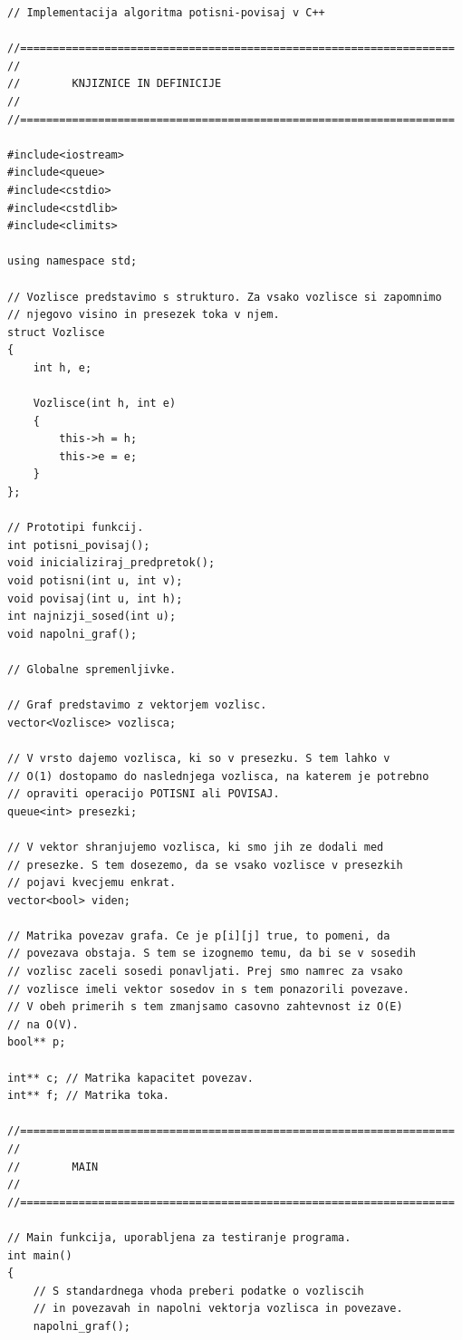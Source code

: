 \documentclass[mat1]{fmfdelo}
\begin{document}
\begin{verbatim}
// Implementacija algoritma potisni-povisaj v C++

//===================================================================
//
//        KNJIZNICE IN DEFINICIJE
//
//===================================================================

#include<iostream>
#include<queue>
#include<cstdio>
#include<cstdlib>
#include<climits>

using namespace std;

// Vozlisce predstavimo s strukturo. Za vsako vozlisce si zapomnimo
// njegovo visino in presezek toka v njem.
struct Vozlisce
{
    int h, e;

    Vozlisce(int h, int e)
    {
        this->h = h;
        this->e = e;
    }
};

// Prototipi funkcij.
int potisni_povisaj();
void inicializiraj_predpretok();
void potisni(int u, int v);
void povisaj(int u, int h);
int najnizji_sosed(int u);
void napolni_graf();

// Globalne spremenljivke.

// Graf predstavimo z vektorjem vozlisc.
vector<Vozlisce> vozlisca;

// V vrsto dajemo vozlisca, ki so v presezku. S tem lahko v
// O(1) dostopamo do naslednjega vozlisca, na katerem je potrebno
// opraviti operacijo POTISNI ali POVISAJ.
queue<int> presezki;

// V vektor shranjujemo vozlisca, ki smo jih ze dodali med
// presezke. S tem dosezemo, da se vsako vozlisce v presezkih
// pojavi kvecjemu enkrat.
vector<bool> viden;

// Matrika povezav grafa. Ce je p[i][j] true, to pomeni, da
// povezava obstaja. S tem se izognemo temu, da bi se v sosedih
// vozlisc zaceli sosedi ponavljati. Prej smo namrec za vsako
// vozlisce imeli vektor sosedov in s tem ponazorili povezave.
// V obeh primerih s tem zmanjsamo casovno zahtevnost iz O(E)
// na O(V).
bool** p;

int** c; // Matrika kapacitet povezav.
int** f; // Matrika toka.

//===================================================================
//
//        MAIN
//
//===================================================================

// Main funkcija, uporabljena za testiranje programa.
int main()
{
    // S standardnega vhoda preberi podatke o vozliscih
    // in povezavah in napolni vektorja vozlisca in povezave.
    napolni_graf();


\end{verbatim}
\end{document}
